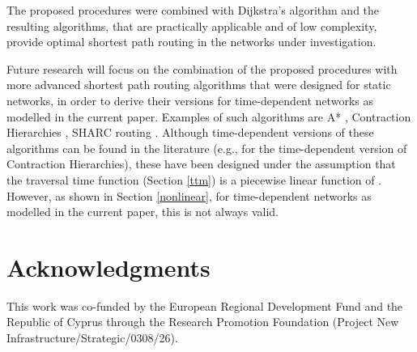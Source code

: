 \documentclass[conference]{IEEEtran}
\begin{document}
The proposed procedures were combined with Dijkstra's algorithm and the resulting algorithms, that are practically applicable and of low complexity, provide optimal shortest path routing in the networks under investigation.

Future research will focus on the combination of the proposed procedures with more advanced shortest path routing algorithms that were designed for static networks, in order to derive their versions for time-dependent networks as modelled in the current paper. Examples of such algorithms are A* \cite{astar}, Contraction Hierarchies \cite{ch}, SHARC routing \cite{sharc}. Although time-dependent versions of these algorithms can be found in the literature (e.g., \cite{Batz} for the time-dependent version of Contraction Hierarchies), these have been designed under the assumption that the traversal time function  (Section \ref{ttm}) is a  piecewise linear function of . However, as shown in Section \ref{nonlinear}, for time-dependent networks as modelled in the current paper, this is not always valid. 


\section*{Acknowledgments}

This  work  was  co-funded  by  the  European  Regional  Development  Fund
and  the  Republic  of  Cyprus  through  the  Research  Promotion  Foundation  (Project
New  Infrastructure/Strategic/0308/26).
\end{document}
